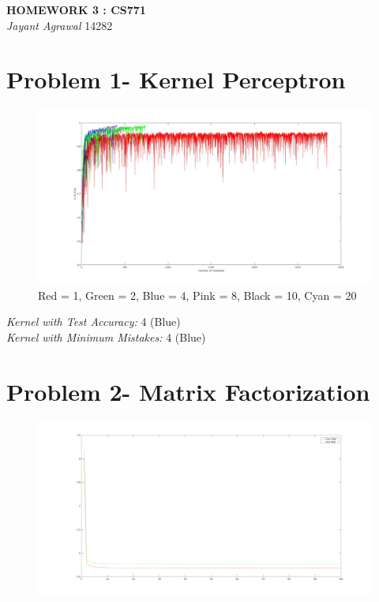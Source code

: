 \documentclass{article}
\begin{document}

\begin{center}
\textbf{\Large HOMEWORK 3 : CS771} \\
\textit{\large Jayant Agrawal}         14282
\end{center}
\section{Problem 1- Kernel Perceptron}
\begin{figure}[h!]
\centering
\includegraphics[width=1\columnwidth]{plot_acc.jpg}
\caption{Red = 1, Green = 2, Blue = 4, Pink = 8, Black = 10, Cyan = 20}
\label{acc}
\end{figure}
\begin{center}
\emph{Kernel with Test Accuracy: }4 (Blue)\\ 
\emph{Kernel with Minimum Mistakes: }4 (Blue) 
\end{center}

\section{Problem 2- Matrix Factorization}
\begin{figure}[h!]
\centering
\includegraphics[width=1\columnwidth]{mae2.png}
\label{mae}
\end{figure}
\end{document}
